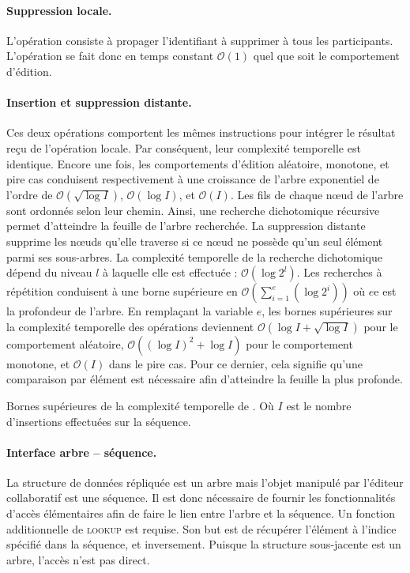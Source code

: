 \paragraph{Suppression locale.} L'opération consiste à propager l'identifiant à
supprimer à tous les participants. L'opération se fait donc en temps constant
$\mathcal{O}(1)$ quel que soit le comportement d'édition.

\paragraph{Insertion et suppression distante.} Ces deux opérations comportent
les mêmes instructions pour intégrer le résultat reçu de l'opération locale. Par
conséquent, leur complexité temporelle est identique. Encore une fois, les
comportements d'édition aléatoire, monotone, et pire cas conduisent
respectivement à une croissance de l'arbre exponentiel de l'ordre de
$\mathcal{O}(\sqrt{\log I})$, $\mathcal{O}(\log I)$, et $\mathcal{O}(I)$.  Les
fils de chaque nœud de l'arbre sont ordonnés selon leur chemin. Ainsi, une
recherche dichotomique récursive permet d'atteindre la feuille de l'arbre
recherchée. La suppression distante supprime les nœuds qu'elle traverse si ce
nœud ne possède qu'un seul élément parmi ses sous-arbres. La complexité
temporelle de la recherche dichotomique dépend du niveau $l$ à laquelle elle est
effectuée : $\mathcal{O}(\log 2^l)$. Les recherches à répétition conduisent à
une borne supérieure en
$\mathcal{O}(\textstyle\sum\nolimits_{i=1}^{e}(\log 2^i))$ où $e$e est la
profondeur de l'arbre. En remplaçant la variable $e$, les bornes supérieures sur
la complexité temporelle des opérations deviennent
$\mathcal{O}(\log I + \sqrt{\log I})$ pour le comportement aléatoire,
$\mathcal{O}((\log I)^2 + \log I)$ pour le comportement monotone, et
$\mathcal{O}(I)$ dans le pire cas. Pour ce dernier, cela signifie qu'une
comparaison par élément est nécessaire afin d'atteindre la feuille la plus
profonde.

\begin{table}
  \begin{center}
    \caption[Bornes supérieures de la complexité temporelle de \LSEQ]
    {\label{repl:table:lseqtime} Bornes supérieures de la complexité temporelle
      de \LSEQ. Où $I$ est le nombre d'insertions effectuées sur la séquence.}
    
  \end{center}
\end{table}


\paragraph{Interface arbre -- séquence.} La structure de données répliquée est
un arbre mais l'objet manipulé par l'éditeur collaboratif est une séquence. Il
est donc nécessaire de fournir les fonctionnalités d'accès élémentaires afin de
faire le lien entre l'arbre et la séquence. Un fonction additionnelle de
\textsc{lookup} est requise. Son but est de récupérer l'élément à l'indice
spécifié dans la séquence, et inversement. Puisque la structure sous-jacente est
un arbre, l'accès n'est pas direct.

